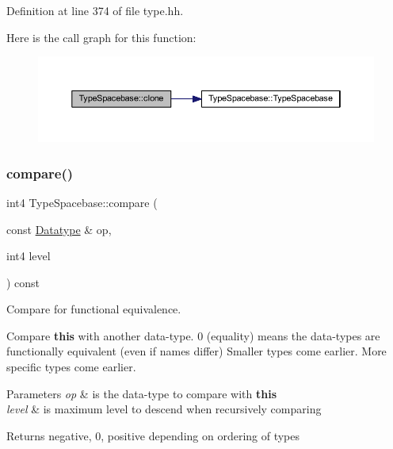 Definition at line 374 of file type.\+hh.

Here is the call graph for this function\+:
\nopagebreak
\begin{figure}[H]
\begin{center}
\leavevmode
\includegraphics[width=350pt]{class_type_spacebase_aefc6e8e08e15b87be40e987a916e85ec_cgraph}
\end{center}
\end{figure}
\mbox{\label{class_type_spacebase_a1ec8296bec1fe983feba0dff1cd78b41}} 
\subsubsection{\texorpdfstring{compare()}{compare()}}
{\footnotesize\ttfamily int4 Type\+Spacebase\+::compare (\begin{DoxyParamCaption}\item[{const \mbox{\hyperlink{class_datatype}{Datatype}} \&}]{op,  }\item[{int4}]{level }\end{DoxyParamCaption}) const\hspace{0.3cm}{\ttfamily [virtual]}}



Compare for functional equivalence. 

Compare {\bfseries{this}} with another data-\/type. 0 (equality) means the data-\/types are functionally equivalent (even if names differ) Smaller types come earlier. More specific types come earlier. 
\begin{DoxyParams}{Parameters}
{\em op} & is the data-\/type to compare with {\bfseries{this}} \\
\hline
{\em level} & is maximum level to descend when recursively comparing \\
\hline
\end{DoxyParams}
\begin{DoxyReturn}{Returns}
negative, 0, positive depending on ordering of types 
\end{DoxyReturn}



